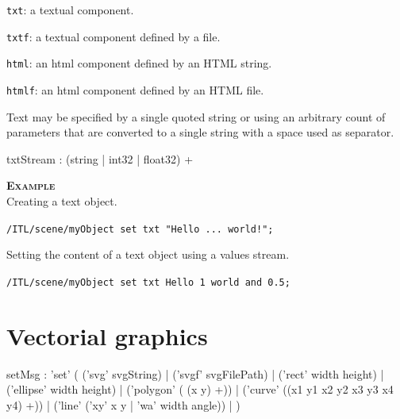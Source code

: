 \documentclass[a4paper,twoside]{report}
\newcommand{\sublevel}[1]	{\section{#1}}
\newcommand{\OSC}[1]		{\texttt{#1}}
\newcommand{\example}		{\textbf{\hspace{-1.5cm}\textbf{\textsc{Example }}}}
\let\olditemize\itemize
\let\oldenditemize\enditemize
\renewenvironment{itemize} 	{\olditemize \setlength{\itemsep}{1mm}}{\oldenditemize}
\newcommand{\sample}	[1]			{\vspace{-2mm}\begin{center}\colorbox{mygrey}{
								\begin{minipage}[t]{0.9\columnwidth} 
								{\small \texttt{#1}}
								\end{minipage}}\end{center}}
\begin{document}
\begin{itemize}
\item \OSC{txt}: a textual component.
\item \OSC{txtf}: a textual component defined by a file.
\item \OSC{html}: an html component defined by an HTML string.
\item \OSC{htmlf}: an html component defined by an HTML file.
\end{itemize}

Text may be specified by a single quoted string or using an arbitrary count of parameters that are converted to a single string with a space used as separator.
\begin{rail}
txtStream :  (string | int32 | float32) +
\end{rail}

\example \\
Creating a text object.
\sample{/ITL/scene/myObject set txt "Hello ...    world!";}
Setting the content of a text object using a values stream.
\sample{/ITL/scene/myObject set txt Hello 1 world and 0.5; }


\sublevel{Vectorial graphics}
\label{vgraphscore}
\begin{rail}
setMsg : 'set' (
	('svg' svgString) |
	('svgf' svgFilePath) |
	('rect' width height) |
	('ellipse' width height) |
	('polygon' ( (x y) +)) |
	('curve' ((x1 y1 x2 y2 x3 y3 x4 y4) +)) |
	('line' ('xy' x y | 'wa' width angle)) |
)
\end{rail}
\end{document}
